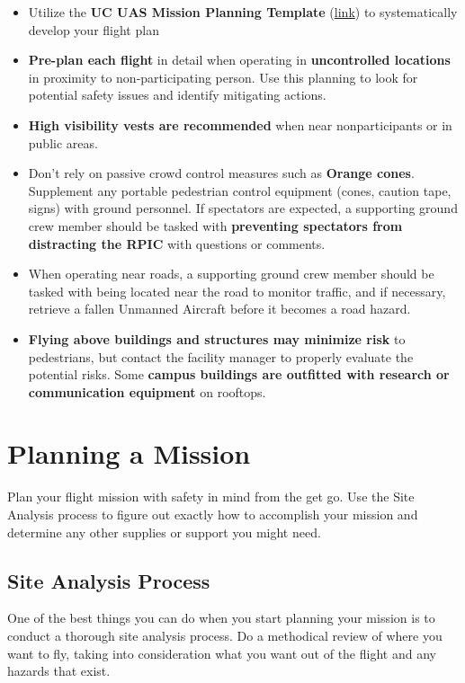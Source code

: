 \documentclass[
  12pt,
]{book}
\providecommand{\tightlist}{%
  \setlength{\itemsep}{0pt}\setlength{\parskip}{0pt}}
\begin{document}
\begin{itemize}
\tightlist
\item
  Utilize the \textbf{UC UAS Mission Planning Template} (\href{http://ucdrones.github.io/library/mission_planning_template.docx}{link}) to systematically develop your flight plan
\item
  \textbf{Pre-plan each flight} in detail when operating in \textbf{uncontrolled locations} in proximity to non-participating person. Use this planning to look for potential safety issues and identify mitigating actions.
\item
  \textbf{High visibility vests are recommended} when near nonparticipants or in public areas.
\item
  Don't rely on passive crowd control measures such as \textbf{Orange cones}. Supplement any portable pedestrian control equipment (cones, caution tape, signs) with ground personnel. If spectators are expected, a supporting ground crew member should be tasked with \textbf{preventing spectators from distracting the RPIC} with questions or comments.
\item
  When operating near roads, a supporting ground crew member should be tasked with being located near the road to monitor traffic, and if necessary, retrieve a fallen Unmanned Aircraft before it becomes a road hazard.
\item
  \textbf{Flying above buildings and structures may minimize risk} to pedestrians, but contact the facility manager to properly evaluate the potential risks. Some \textbf{campus buildings are outfitted with research or communication equipment} on rooftops.
\end{itemize}

\section{Planning a Mission}\label{mission}

Plan your flight mission with safety in mind from the get go. Use the Site Analysis process to figure out exactly how to accomplish your mission and determine any other supplies or support you might need.

\subsection{Site Analysis Process}\label{site-analysis-process}

One of the best things you can do when you start planning your mission is to conduct a thorough site analysis process. Do a methodical review of where you want to fly, taking into consideration what you want out of the flight and any hazards that exist.
\end{document}
